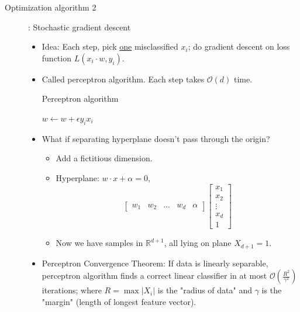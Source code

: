 \documentclass[10pt]{article}
\begin{document}
\begin{description}
	\item[Optimization algorithm 2]: Stochastic gradient descent
		\
		\begin{itemize}
			\item Idea: Each step, pick \underline{one} misclassified $x_{i}$; do gradient descent on loss function $L(x_{i} \cdot w, y_{i})$.
			\item Called perceptron algorithm. Each step takes $\mathcal{O}(d)$ time.

			\begin{algorithm*}
			\caption{Perceptron algorithm}
			\begin{algorithmic}
			\State $w \leftarrow w + \epsilon y_{i}x_{i}$
			\EndWhile
			\end{algorithmic}
			\end{algorithm*}
		
		\item What if separating hyperplane doesn't pass through the origin?
			\begin{itemize}
				\item Add a fictitious dimension.
				\item Hyperplane: $w \cdot x + \alpha = 0$,
					$$
						\begin{bmatrix} w_{1} & w_{2} & \dots & w_{d} & \alpha \end{bmatrix}
						\begin{bmatrix}
 							x_{1} \\
 							x_{2} \\
 							\vdots \\
 							x_{d}	\\
 							1
 						\end{bmatrix}
					$$
				\item Now we have samples in $\mathbb{R}^{d+1}$, all lying on plane $X_{d+1} = 1$.
			\end{itemize}
		
		\item Perceptron Convergence Theorem: If data is linearly separable, perceptron algorithm finds a correct linear classifier in at most $\mathcal{O}(\frac{R^{2}}{\gamma^{2}})$ iterations; where $R = \max |X_{i}|$ is the "radius of data" and $\gamma$ is the "margin"  (length of longest feature vector).
		\end{itemize}
		

\end{description}
\end{document}
